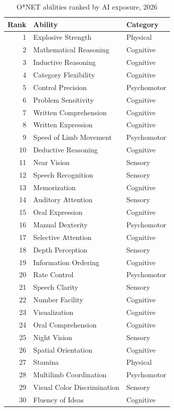 \begin{table}[htbp]\centering
\caption{O*NET abilities ranked by AI exposure, 2026}\label{tab:abilityrank}
\begin{tabular}{rll}\toprule
Rank & Ability & Category \\ \midrule
1 & Explosive Strength & Physical \\
2 & Mathematical Reasoning & Cognitive \\
3 & Inductive Reasoning & Cognitive \\
4 & Category Flexibility & Cognitive \\
5 & Control Precision & Psychomotor \\
6 & Problem Sensitivity & Cognitive \\
7 & Written Comprehension & Cognitive \\
8 & Written Expression & Cognitive \\
9 & Speed of Limb Movement & Psychomotor \\
10 & Deductive Reasoning & Cognitive \\
11 & Near Vision & Sensory \\
12 & Speech Recognition & Sensory \\
13 & Memorization & Cognitive \\
14 & Auditory Attention & Sensory \\
15 & Oral Expression & Cognitive \\
16 & Manual Dexterity & Psychomotor \\
17 & Selective Attention & Cognitive \\
18 & Depth Perception & Sensory \\
19 & Information Ordering & Cognitive \\
20 & Rate Control & Psychomotor \\
21 & Speech Clarity & Sensory \\
22 & Number Facility & Cognitive \\
23 & Visualization & Cognitive \\
24 & Oral Comprehension & Cognitive \\
25 & Night Vision & Sensory \\
26 & Spatial Orientation & Cognitive \\
27 & Stamina & Physical \\
28 & Multilimb Coordination & Psychomotor \\
29 & Visual Color Discrimination & Sensory \\
30 & Fluency of Ideas & Cognitive \\

\end{tabular}
\end{table}

